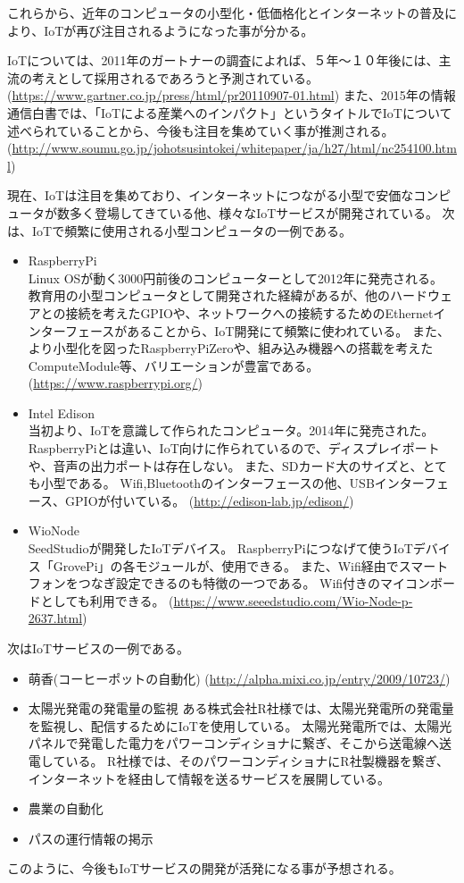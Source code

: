 これらから、近年のコンピュータの小型化・低価格化とインターネットの普及により、IoTが再び注目されるようになった事が分かる。


IoTについては、2011年のガートナーの調査によれば、５年〜１０年後には、主流の考えとして採用されるであろうと予測されている。
(\url{https://www.gartner.co.jp/press/html/pr20110907-01.html})
また、2015年の情報通信白書では、「IoTによる産業へのインパクト」というタイトルでIoTについて述べられていることから、今後も注目を集めていく事が推測される。
(\url{http://www.soumu.go.jp/johotsusintokei/whitepaper/ja/h27/html/nc254100.html})

現在、IoTは注目を集めており、インターネットにつながる小型で安価なコンピュータが数多く登場してきている他、様々なIoTサービスが開発されている。
次は、IoTで頻繁に使用される小型コンピュータの一例である。
\begin{itemize}
\item RaspberryPi\\
	Linux OSが動く3000円前後のコンピューターとして2012年に発売される。
	教育用の小型コンピュータとして開発された経緯があるが、他のハードウェアとの接続を考えたGPIOや、ネットワークへの接続するためのEthernetインターフェースがあることから、IoT開発にて頻繁に使われている。
	また、より小型化を図ったRaspberryPiZeroや、組み込み機器への搭載を考えたComputeModule等、バリエーションが豊富である。
	(\url{https://www.raspberrypi.org/})
\item Intel Edison\\
	当初より、IoTを意識して作られたコンピュータ。2014年に発売された。
	RaspberryPiとは違い、IoT向けに作られているので、ディスプレイポートや、音声の出力ポートは存在しない。
	また、SDカード大のサイズと、とても小型である。
	Wifi,Bluetoothのインターフェースの他、USBインターフェース、GPIOが付いている。
	(\url{http://edison-lab.jp/edison/})
\item WioNode\\
	SeedStudioが開発したIoTデバイス。
	RaspberryPiにつなげて使うIoTデバイス「GrovePi」の各モジュールが、使用できる。
	また、Wifi経由でスマートフォンをつなぎ設定できるのも特徴の一つである。
	Wifi付きのマイコンボードとしても利用できる。
	(\url{https://www.seeedstudio.com/Wio-Node-p-2637.html})
\end{itemize}

次はIoTサービスの一例である。
\begin{itemize}
\item 萌香(コーヒーポットの自動化)
	(\url{http://alpha.mixi.co.jp/entry/2009/10723/})
\item 太陽光発電の発電量の監視
	ある株式会社R社様では、太陽光発電所の発電量を監視し、配信するためにIoTを使用している。
	太陽光発電所では、太陽光パネルで発電した電力をパワーコンディショナに繋ぎ、そこから送電線へ送電している。
	R社様では、そのパワーコンディショナにR社製機器を繋ぎ、インターネットを経由して情報を送るサービスを展開している。
\item 農業の自動化
	
\item パスの運行情報の掲示

\end{itemize}
このように、今後もIoTサービスの開発が活発になる事が予想される。

